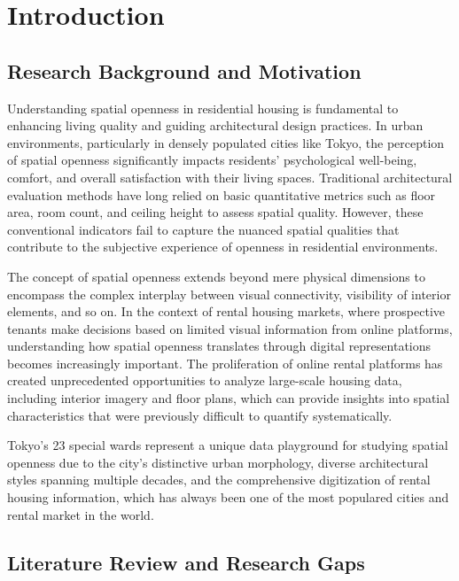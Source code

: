 \chapter{Introduction}

\section{Research Background and Motivation}

Understanding spatial openness in residential housing is fundamental to enhancing living quality and guiding 
architectural design practices. In urban environments, particularly in densely populated cities like Tokyo, the 
perception of spatial openness significantly impacts residents' psychological well-being, comfort, and overall 
satisfaction with their living spaces. Traditional architectural evaluation methods have long relied on basic 
quantitative metrics such as floor area, room count, and ceiling height to assess spatial quality. However, these 
conventional indicators fail to capture the nuanced spatial qualities that contribute to the subjective experience 
of openness in residential environments.

The concept of spatial openness extends beyond mere physical dimensions to encompass the complex interplay between 
visual connectivity, visibility of interior elements, and so on. In the context of rental housing markets, where 
prospective tenants make decisions based on limited visual information from online platforms, understanding how 
spatial openness translates through digital representations becomes increasingly important. The proliferation of 
online rental platforms has created unprecedented opportunities to analyze large-scale housing data, including 
interior imagery and floor plans, which can provide insights into spatial characteristics that were previously 
difficult to quantify systematically.

Tokyo's 23 special wards represent a unique data playground for studying spatial openness due to the city's 
distinctive urban morphology, diverse architectural styles spanning multiple decades, and the comprehensive 
digitization of rental housing information, which has always been one of the most populared cities and rental 
market in the world.

\section{Literature Review and Research Gaps}

